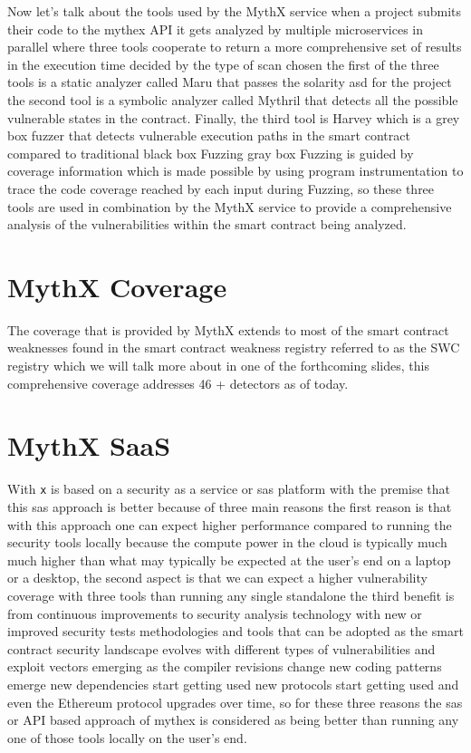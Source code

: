 Now let's talk about the tools used by the MythX service when a project submits their code to the mythex API it gets analyzed by multiple microservices in parallel where three tools cooperate to return a more comprehensive set of results in the execution time decided by the type of scan chosen the first of the three tools is a static analyzer called Maru that passes the solarity asd for the project the second tool is a symbolic analyzer called Mythril that detects all the possible vulnerable states in the contract. Finally, the third tool is Harvey which is a grey box fuzzer that detects vulnerable execution paths in the smart contract compared to traditional black box Fuzzing gray box Fuzzing is guided by coverage information which is made possible by using program instrumentation to trace the code coverage reached by each input during Fuzzing, so these three tools are used in combination by the MythX service to provide a comprehensive analysis of the vulnerabilities within the smart contract being analyzed.

\section{MythX Coverage}

The coverage that is provided by MythX extends to most of the smart contract weaknesses found in the smart contract weakness registry referred to as the SWC registry which we will talk more about in one of the forthcoming slides, this comprehensive coverage addresses 46 + detectors as of today.

\section{MythX SaaS}

With \verb|x| is based on a security as a service or sas platform with the premise that this sas approach is better because of three main reasons the first reason is that with this approach one can expect higher performance compared to running the security tools locally because the compute power in the cloud is typically much much higher than what may typically be expected at the user's end on a laptop or a desktop, the second aspect is that we can expect a higher vulnerability coverage with three tools than running any single standalone the third benefit is from continuous improvements to security analysis technology with new or improved security tests methodologies and tools that can be adopted as the smart contract security landscape evolves with different types of vulnerabilities and exploit vectors emerging as the compiler revisions change new coding patterns emerge new dependencies start getting used new protocols start getting used and even the Ethereum protocol upgrades over time, so for these three reasons the sas or API based approach of mythex is considered as being better than running any one of those tools locally on the user's end.

